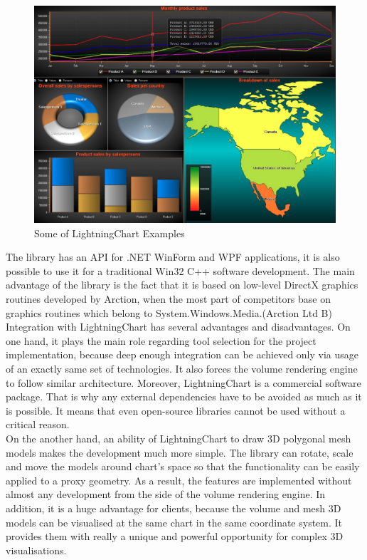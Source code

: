 \documentclass[twoside, english, 11pt]{report}
\begin{document}
\begin{figure}[!h]
\centerline{\includegraphics[scale=0.4]{img/chart}}
\caption{Some of LightningChart Examples}
\end{figure}

The library has an API for .NET WinForm and WPF applications, it is also possible to use it for a traditional Win32 C++ software development. The main advantage of the library is the fact that it is based on low-level DirectX graphics routines developed by Arction, when the most part of competitors base on graphics routines which belong to System.Windows.Media.(Arction Ltd B)\\

Integration with LightningChart has several advantages and disadvantages. On one hand, it plays the main role regarding tool selection for the project implementation, because deep enough integration can be achieved only via usage of an exactly same set of technologies. It also forces the volume rendering engine to follow similar architecture. Moreover, LightningChart is a commercial software package. That is why any external dependencies have to be avoided as much as it is possible. It means that even open-source libraries cannot be used without a critical reason.\\

On the another hand, an ability of LightningChart to draw 3D polygonal mesh models makes the development much more simple. The library can rotate, scale and move the models around chart's space so that the functionality can be easily applied to a proxy geometry. As a result, the features are implemented without almost any development from the side of the volume rendering engine. In addition, it is a huge advantage for clients, because the volume and mesh 3D models can be visualised at the same chart in the same coordinate system. It provides them with really a unique and powerful opportunity for complex 3D visualisations.
\end{document}

